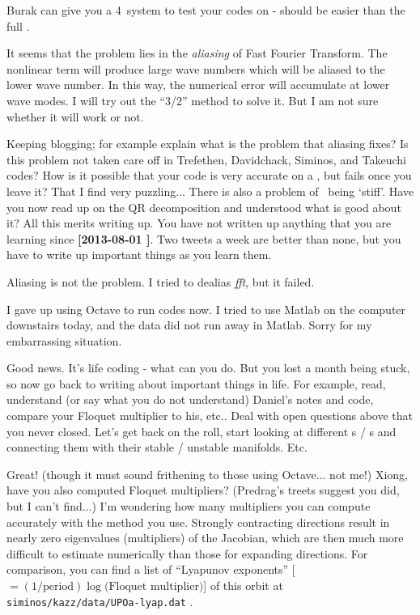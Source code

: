 \begin{description}
Burak can give you a 4\dmn\ system to test your codes on - should be
easier than the full \KS.

\item[2013-08-27 \XD]
It seems that the problem lies in the \textit{aliasing} of Fast Fourier
Transform. The nonlinear term will produce large wave numbers which
will be aliased to the lower wave number. In this way, the numerical error
will accumulate at lower wave modes. I will try out the ``3/2''
method to solve it. But I am not sure whether it will work or not.

\item[2013-08-28 Predrag] Keeping blogging; for example explain what
is the problem that aliasing fixes? Is this problem not taken care
off in Trefethen, Davidchack, Siminos, and Takeuchi codes? How is it
possible that your code is very accurate on a \po, but fails once you
leave it? That I find very puzzling... There is also a problem of
\KS\ being `stiff'. Have you now read up on the QR decomposition and
understood what is good about it? All this merits writing up. You
have not written up anything that you are learning since {\bf
[2013-08-01 \XD]}. Two tweets a week are better than none, but
you have to write up important things as you learn them.

\item[2013-08-28 \XD]
Aliasing is not the problem. I tried to dealias \textit{fft}, but it failed.

I gave up using Octave to run codes now. I tried to use Matlab on
the computer downstairs today, and the data did not run away in Matlab.
Sorry for my embarrassing situation.

\item[2013-08-28 Predrag] Good news. It's life coding - what can you do.
But you lost a month being stuck, so now go back to writing about important
things in life. For example, read, understand (or say what you do not understand)
Daniel's notes and code, compare your Floquet multiplier to his, etc..
Deal with open questions above that you never closed. Let's
get back on the roll, start looking at different \po s / \rpo s and
connecting them with their stable / unstable manifolds. Etc.

\item[2013-08-30 Kazumasa]
Great! (though it must sound frithening to those using Octave... not me!)
Xiong, have you also computed Floquet multipliers?
(Predrag's treets suggest you did, but I can't find...)
I'm wondering how many multipliers you can compute accurately
 with the method you use.
Strongly contracting directions result in nearly zero eigenvalues (multipliers)
 of the Jacobian, which are then much more difficult
 to estimate numerically than those for expanding directions.
For comparison, you can find a list of ``Lyapunov exponents''
 [$=(1/\text{period})\log\text{(Floquet multiplier)}$] of this orbit at\\
\texttt{siminos/kazz/data/UPOa-lyap.dat} .


\end{description}
